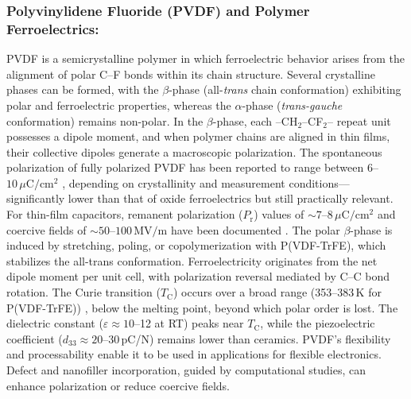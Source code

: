 \documentclass[a4paper,fleqn]{cas-sc}
\begin{document}
\subsubsection*{Polyvinylidene Fluoride (PVDF) and Polymer Ferroelectrics: }
\par PVDF is a semicrystalline polymer in which ferroelectric behavior arises from the alignment of polar C--F bonds within its chain structure. Several crystalline phases can be formed, with the $\beta$-phase (all-\textit{trans} chain conformation) exhibiting polar and ferroelectric properties, whereas the $\alpha$-phase (\textit{trans-gauche} conformation) remains non-polar. In the $\beta$-phase, each --CH$_2$--CF$_2$-- repeat unit possesses a dipole moment, and when polymer chains are aligned in thin films, their collective dipoles generate a macroscopic polarization. The spontaneous polarization of fully polarized PVDF has been reported to range between $6$--$10\,\mu\mathrm{C}/\mathrm{cm}^2$ \cite{mai2015ferroelectric, tang2017multiaxial}, depending on crystallinity and measurement conditions---significantly lower than that of oxide ferroelectrics but still practically relevant. For thin-film capacitors, remanent polarization ($P_\mathrm{r}$) values of $\sim\!7$--$8\,\mu\mathrm{C}/\mathrm{cm}^2$ and coercive fields of $\sim\!50$--$100\,\mathrm{MV}/\mathrm{m}$ have been documented \cite{garcia2017ferroelectric,anwar2019one}. The polar $\beta$-phase is induced by stretching, poling, or copolymerization with P(VDF-TrFE), which stabilizes the all-trans conformation. Ferroelectricity originates from the net dipole moment per unit cell, with polarization reversal mediated by C--C bond rotation. The Curie transition ($T_{\mathrm{C}}$) occurs over a broad range (353--383\,K for P(VDF-TrFE)) \cite{Vasic2021,Gong2022}, below the melting point, beyond which polar order is lost. The dielectric constant ($\varepsilon \approx 10$--12 at RT) peaks near $T_{\mathrm{C}}$, while the piezoelectric coefficient ($d_{33} \approx 20$--30\,pC/N) remains lower than ceramics. PVDF's flexibility and processability enable it to be used in applications for flexible electronics. Defect and nanofiller incorporation, guided by computational studies, can enhance polarization or reduce coercive fields.
\end{document}
